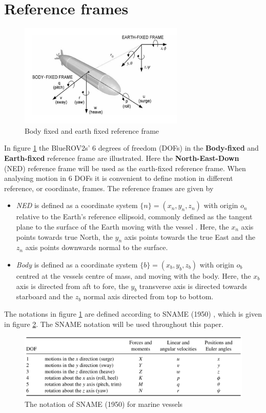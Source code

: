 \section{Reference frames}
\begin{figure}[H]
    \centering
    \includegraphics[width=0.7\textwidth]{images/chap4/reference_frames.png}
    \caption{Body fixed and earth fixed reference frame}
    \label{fig:reference_frame}
\end{figure}
In figure \ref{fig:reference_frame} the BlueROV2s' 6 degrees of freedom (DOFs) in the \textbf{Body-fixed} and \textbf{Earth-fixed} reference frame are illustrated. Here the \textbf{North-East-Down} (NED) reference frame will be used as the earth-fixed reference frame. When analysing motion in 6 DOFs it is convenient to define motion in different reference, or coordinate, frames. The reference frames are given by
\begin{itemize}
    \item \textit{NED} is defined as a coordinate system $\{n\} = (x_{n},y_{n},z_{n})$ with origin $o_{n}$ relative to the Earth's reference ellipsoid, commonly defined as the tangent plane to the surface of the Earth moving with the vessel \cite{Fossen}. Here, the $x_{n}$ axis points towards true North, the $y_{n}$ axis points towards the true East and the $z_{n}$ axis points downwards normal to the surface. 
    \item \textit{Body} is defined as a coordinate system $\{b\} = (x_{b},y_{b},z_{b})$ with origin $o_{b}$ centred at the vessels centre of mass, and moving with the body. Here, the $x_{b}$ axis is directed from aft to fore, the $y_{b}$ transverse axis is directed towards starboard and the $z_{b}$ normal axis directed from top to bottom. 
\end{itemize}
The notations in figure \ref{fig:reference_frame} are defined according to SNAME (1950) \cite{Fossen}, which is given in figure \ref{fig:sname}. The SNAME notation will be used throughout this paper. 
\begin{figure}
    \centering
    \includegraphics[width=\textwidth]{images/chap4/SNAME.png}
    \caption{The notation of SNAME (1950) for marine vessels}
    \label{fig:sname}
\end{figure}
